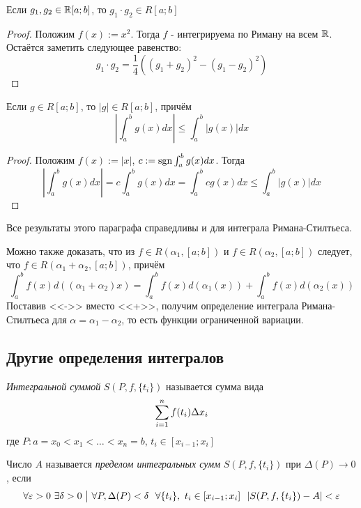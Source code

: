 \begin{corollary}
	Если $g_1, g_2 \in \mathbb{R}[a; b]$, то $g_1 \cdot g_2 \in R[a; b]$
\end{corollary}

\begin{proof}
	Положим $f(x) := x^2$. Тогда $f$ - интегрируема по Риману на всем $\mathbb{R}$. Остаётся заметить следующее равенство:
	\[
		g_1 \cdot g_2 = \frac{1}{4}((g_1 + g_2)^2 - (g_1 - g_2)^2)
	\]
\end{proof}

\begin{corollary}
	Если $g \in R[a; b]$, то $|g| \in R[a; b]$, причём
	\[
		\left|\int_a^b g(x)dx\right| \le \int_a^b |g(x)|dx
	\]
\end{corollary}

\begin{proof}
	Положим $f(x) := |x|$, $c := \operatorname{sgn} \int_a^b g(x)dx$. Тогда
	\[
		\left|\int_a^b g(x)dx\right| = c\int_a^b g(x)dx = \int_a^b cg(x)dx \le \int_a^b |g(x)|dx
	\]
\end{proof}

\begin{note}
	Все результаты этого параграфа справедливы и для интеграла Римана-Стилтьеса.
\end{note}

\begin{note}
	Можно также доказать, что из $f \in R(\alpha_1, [a; b])$ и $f \in R(\alpha_2, [a; b])$ следует, что $f \in R(\alpha_1 + \alpha_2, [a; b])$, причём
	\[
		\int_a^b f(x) d((\alpha_1 + \alpha_2)x) = \int_a^b f(x) d(\alpha_1(x)) + \int_a^b f(x)d(\alpha_2(x))
	\]
	Поставив <<->> вместо <<+>>, получим определение интеграла Римана-Стилтьеса для $\alpha = \alpha_1 - \alpha_2$, то есть функции ограниченной вариации.
\end{note}

\subsection{Другие определения интегралов}

\begin{definition}
	\textit{Интегральной суммой} $S(P, f, \{t_i\})$ называется сумма вида
	\[
		\sum\limits_{i = 1}^n f(t_i) \Delta x_i
	\]
	где $P: a = x_0 < x_1 < \ldots < x_n = b$, $t_i \in [x_{i - 1}; x_i]$
\end{definition}

\begin{definition}
	Число $A$ называется \textit{пределом интегральных сумм} $S(P, f, \{t_i\})$ при $\Delta(P) \to 0$, если
	\[
		\forall \varepsilon > 0\ \exists \delta > 0 \ \big|\  \forall P, \Delta(P) < \delta\ \ \forall \{t_i\},\ t_i \in [x_{i - 1}; x_i]\ \ |S(P, f, \{t_i\}) - A| < \varepsilon
	\]
\end{definition}

